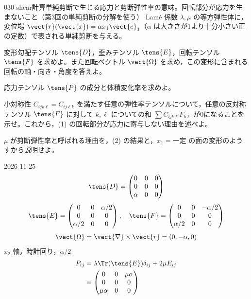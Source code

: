 \documentclass[uplatex,dvipdfmx,a4paper,11pt]{jsarticle}
\begin{document}
\begin{mondai}{030-shear}{計算}{単純剪断で生じる応力と剪断弾性率の意味。回転部分が応力を生まないこと（第3回の単純剪断の分解を使う）}
Lamé 係数 $\lambda,\mu$ の等方弾性体に，変位場 $\vect{r}(\vect{x})=\alpha x_1\vect{e}_3$（$\alpha$ は大きさが1より十分小さい正の定数）で表される単純剪断を与える。
  \begin{shoumon}
    \item 変形勾配テンソル $\tens{D}$，歪みテンソル $\tens{E}$，回転テンソル $\tens{F}$ を求めよ。また回転ベクトル $\vect{\Omega}$ を求め，この変形に含まれる回転の軸・向き・角度を答えよ。
    \item 応力テンソル $\tens{P}$ の成分と体積変化率を求めよ。
    \item 小対称性 $C_{ijk\ell}=C_{ij\ell k}$ を満たす任意の弾性率テンソルについて，任意の反対称テンソル $\tens{F}$ に対して $k,\ell$ についての和 $\sum C_{ijk\ell}F_{k\ell}$ が0になることを示せ。これから，(1) の回転部分が応力に寄与しない理由を述べよ。
    \item $\mu$ が剪断弾性率と呼ばれる理由を，(2) の結果と，$x_1=\text{一定}$ の面の変形のようすから説明せよ。
  \end{shoumon}
\begin{kotaeutsushi}{2026-11-25}
\[ \tens{D}=\begin{pmatrix}0&0&0\\0&0&0\\\alpha&0&0\end{pmatrix} \]
\[ \tens{E}=\begin{pmatrix}0&0&\alpha/2\\0&0&0\\\alpha/2&0&0\end{pmatrix},\quad \tens{F}=\begin{pmatrix}0&0&-\alpha/2\\0&0&0\\\alpha/2&0&0\end{pmatrix} \]
\[ \vect{\Omega}=\vect{\nabla}\times\vect{r}=(0,-\alpha,0) \]
$x_{2}$ 軸，時計回り，$\alpha/2$
\begin{align*}
P_{ij}&=\lambda\Tr(\tens{E})\delta_{ij}+2\mu E_{ij}\\
&=\begin{pmatrix}0&0&\mu\alpha\\0&0&0\\\mu\alpha&0&0\end{pmatrix}

\end{align*}
\end{kotaeutsushi}
\end{mondai}
\end{document}
